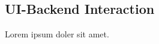 \subsectionfont{\fontsize{14}{14}\selectfont}
\subsection{UI-Backend Interaction}
Lorem ipsum doler sit amet.